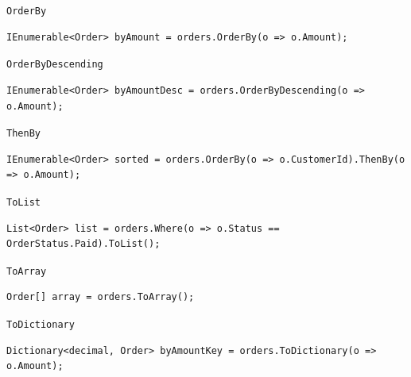 \documentclass[aspectratio=169,10pt,t]{beamer}
\begin{document}
\begin{frame}[fragile]{\texttt{OrderBy}}
  \slidetop
\begin{lstlisting}[style=csharp,basicstyle=\ttfamily\small]
IEnumerable<Order> byAmount = orders.OrderBy(o => o.Amount);
\end{lstlisting}
\end{frame}

\begin{frame}[fragile]{\texttt{OrderByDescending}}
  \slidetop
\begin{lstlisting}[style=csharp,basicstyle=\ttfamily\small]
IEnumerable<Order> byAmountDesc = orders.OrderByDescending(o => o.Amount);
\end{lstlisting}
\end{frame}

\begin{frame}[fragile]{\texttt{ThenBy}}
  \slidetop
\begin{lstlisting}[style=csharp,basicstyle=\ttfamily\fontsize{8.2}{9.6}\selectfont]
IEnumerable<Order> sorted = orders.OrderBy(o => o.CustomerId).ThenBy(o => o.Amount);
\end{lstlisting}
\end{frame}

\begin{frame}[fragile]{\texttt{ToList}}
  \slidetop
\begin{lstlisting}[style=csharp,basicstyle=\ttfamily\small]
List<Order> list = orders.Where(o => o.Status == OrderStatus.Paid).ToList();
\end{lstlisting}
\end{frame}

\begin{frame}[fragile]{\texttt{ToArray}}
  \slidetop
\begin{lstlisting}[style=csharp,basicstyle=\ttfamily\small]
Order[] array = orders.ToArray();
\end{lstlisting}
\end{frame}

\begin{frame}[fragile]{\texttt{ToDictionary}}
  \slidetop
\begin{lstlisting}[style=csharp,basicstyle=\ttfamily\small]
Dictionary<decimal, Order> byAmountKey = orders.ToDictionary(o => o.Amount);
\end{lstlisting}
  \slidegap
\end{frame}
\end{document}

